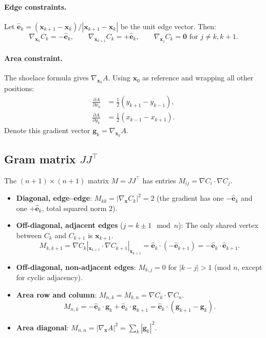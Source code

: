 \documentclass[12pt]{article}
\newcommand{\pderiv}[2]{\frac{\partial #1}{\partial #2}}
\begin{document}
\paragraph{Edge constraints.}
Let $\hat{\mathbf{e}}_k = (\mathbf{x}_{k+1} - \mathbf{x}_k)/|\mathbf{x}_{k+1}-\mathbf{x}_k|$
be the unit edge vector.  Then:
\[
  \nabla_{\mathbf{x}_k} C_k = -\hat{\mathbf{e}}_k, \qquad
  \nabla_{\mathbf{x}_{k+1}} C_k = +\hat{\mathbf{e}}_k, \qquad
  \nabla_{\mathbf{x}_j} C_k = \mathbf{0} \text{ for } j \neq k, k+1.
\]

\paragraph{Area constraint.}
The shoelace formula gives $\nabla_{\mathbf{x}_k} A$.  Using $\mathbf{x}_0$ as reference and
wrapping all other positions:
\begin{align*}
  \pderiv{A}{x_k} &= \tfrac{1}{2}(y_{k+1} - y_{k-1}), \\
  \pderiv{A}{y_k} &= \tfrac{1}{2}(x_{k-1} - x_{k+1}).
\end{align*}
Denote this gradient vector $\mathbf{g}_k = \nabla_{\mathbf{x}_k} A$.

\subsection{Gram matrix $JJ^\top$}

The $(n+1)\times(n+1)$ matrix $M = JJ^\top$ has entries $M_{ij} = \nabla C_i \cdot \nabla C_j$.

\begin{itemize}
  \item \textbf{Diagonal, edge–edge}: $M_{kk} = |\nabla_\mathbf{x} C_k|^2 = 2$
        (the gradient has one $-\hat{\mathbf{e}}_k$ and one $+\hat{\mathbf{e}}_k$, total squared norm $2$).
  \item \textbf{Off-diagonal, adjacent edges} ($j = k\pm 1\mod n$):
        The only shared vertex between $C_k$ and $C_{k+1}$ is $\mathbf{x}_{k+1}$.
        \[M_{k,k+1} = \nabla C_k|_{\mathbf{x}_{k+1}} \cdot \nabla C_{k+1}|_{\mathbf{x}_{k+1}}
          = \hat{\mathbf{e}}_k \cdot (-\hat{\mathbf{e}}_{k+1}) = -\hat{\mathbf{e}}_k \cdot \hat{\mathbf{e}}_{k+1}.\]
  \item \textbf{Off-diagonal, non-adjacent edges}: $M_{k,j} = 0$ for $|k-j| > 1$ (mod $n$,
        except for cyclic adjacency).
  \item \textbf{Area row and column}: $M_{n,k} = M_{k,n} = \nabla C_k \cdot \nabla C_n$.
        \[M_{n,k} = -\hat{\mathbf{e}}_k\cdot\mathbf{g}_k + \hat{\mathbf{e}}_k\cdot\mathbf{g}_{k+1}
          = \hat{\mathbf{e}}_k\cdot(\mathbf{g}_{k+1}-\mathbf{g}_k).\]
  \item \textbf{Area diagonal}: $M_{n,n} = |\nabla_\mathbf{x} A|^2 = \sum_k |\mathbf{g}_k|^2$.
\end{itemize}
\end{document}

